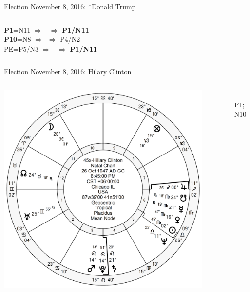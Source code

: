 \begin{frame}[t]{Election November 8, 2016: *Donald Trump}
\begin{columns}[T, onlytextwidth]
\textbf{\dgreen P1}=N11
	$\Rightarrow$ \Mercury\, $\Rightarrow$ \textbf{\dgreen P1/N11}\\
\textbf{\red P10}=N8
	$\Rightarrow$ \Jupiter\,\Retrograde $\Rightarrow$ P4/N2\\
PE=P5/N3
	 $\Rightarrow$ \Venus\, $\Rightarrow$ \textbf{\dgreen P1/N11}

\end{columns}
\end{frame}

\begin{frame}[t]{Election November 8, 2016: Hilary Clinton}
\small
\begin{columns}[T, onlytextwidth]
\vspace{-1em}
{\includegraphics[width=0.9\textwidth]{charts/Hillary.png}}
\fontsize{7pt}{8pt}\selectfont

\Jupiter\, \Trine\, P1; \Square\, N10 


\end{columns}
\end{frame}
